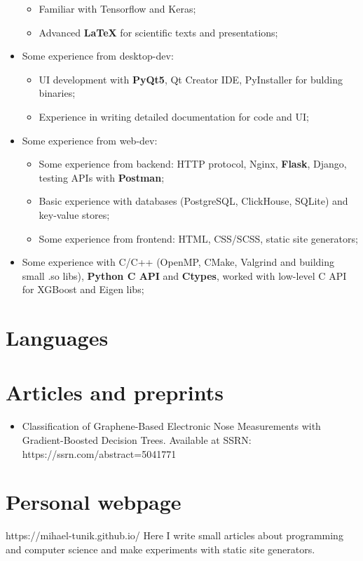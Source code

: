 \documentclass[12pt,a4paper,sans]{moderncv}
\begin{document}
\begin{itemize}
\begin{itemize}
        \item Familiar with Tensorflow and Keras; \newline
        \item Advanced \textbf{LaTeX} for scientific texts and presentations; \newline
    \end{itemize} 
 \item Some experience from desktop-dev:\newline
    \begin{itemize}
        \item UI development with \textbf{PyQt5}, Qt Creator IDE, PyInstaller for bulding binaries; \newline
        \item Experience in writing detailed documentation for code and UI; \newline
    \end{itemize}
 \item Some experience from web-dev: \newline
    \begin{itemize}
        \item Some experience from backend: 
          HTTP protocol, Nginx, \textbf{Flask}, Django, testing APIs with \textbf{Postman};\newline
        \item Basic experience with databases (PostgreSQL, ClickHouse, SQLite) and key-value stores;\newline
        \item Some experience from frontend: HTML, CSS/SCSS, static site generators; \newline
    \end{itemize}
 \item Some experience with C/C++ (OpenMP, CMake, Valgrind and building small .so libs), \textbf{Python C API} and \textbf{Ctypes}, worked with low-level C API for XGBoost and Eigen libs; \newline \newline
 \end{itemize} 
\section{Languages}
\section{Articles and preprints}
 \begin{itemize}
   \item Classification of Graphene-Based Electronic Nose Measurements with Gradient-Boosted Decision Trees. Available at SSRN: https://ssrn.com/abstract=5041771
 \end{itemize} 
\section{Personal webpage}
https://mihael-tunik.github.io/ \newline \newline
Here I write small articles about programming and computer science and make experiments with static site generators.
\end{document}
